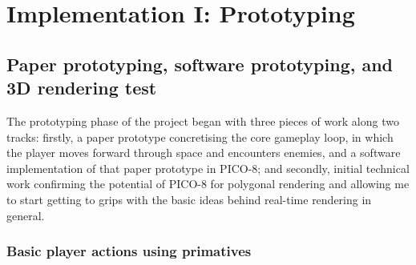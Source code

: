\documentclass[11pt]{article}
\begin{document}
\section{Implementation I: Prototyping}

\subsection{Paper prototyping, software prototyping, and 3D rendering test}\label{prototyping}
The prototyping phase of the project began with three pieces of work along two tracks: firstly,
a paper prototype concretising the core gameplay loop, in which the player moves forward through
space and encounters enemies, and a software implementation of that paper prototype in PICO-8; and
secondly, initial technical work confirming the potential of PICO-8 for polygonal rendering and
allowing me to start getting to grips with the basic ideas behind real-time rendering in general.

\subsubsection*{Basic player actions using primatives}
\end{document}
